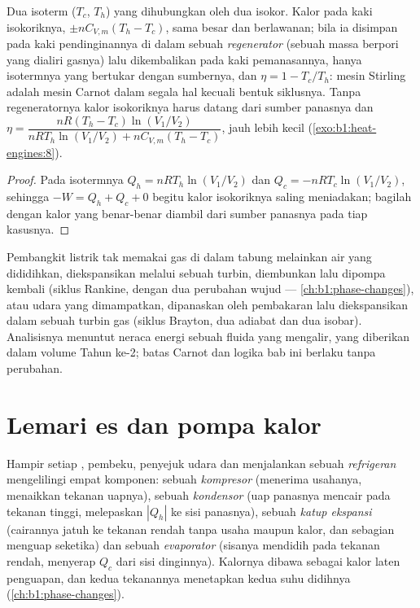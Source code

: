 \begin{proposition}\label{prop:b1:heat-engines:stirling}
Dua isoterm ($T_c$, $T_h$) yang dihubungkan oleh dua isokor. Kalor pada
kaki isokoriknya, $\pm nC_{V,m}(T_h - T_c)$, sama besar dan berlawanan; bila ia
disimpan pada kaki pendinginannya di dalam sebuah \emph{regenerator} (sebuah massa berpori yang
dialiri gasnya) lalu dikembalikan pada kaki pemanasannya, hanya isotermnya
yang bertukar dengan sumbernya, dan $\eta = 1 - T_c/T_h$: mesin Stirling
adalah mesin Carnot dalam segala hal kecuali bentuk siklusnya. Tanpa
regeneratornya kalor isokoriknya harus datang dari sumber panasnya dan
$\eta = \dfrac{nR(T_h - T_c)\ln(V_1/V_2)}{nRT_h\ln(V_1/V_2) + nC_{V,m}(T_h - T_c)}$,
jauh lebih kecil (\cref{exo:b1:heat-engines:8}).
\end{proposition}

\begin{proof}
Pada isotermnya $Q_h = nRT_h\ln(V_1/V_2)$ dan $Q_c = -nRT_c\ln(V_1/V_2)$, sehingga
$-W = Q_h + Q_c + 0$ begitu kalor isokoriknya saling meniadakan; bagilah dengan kalor
yang benar-benar diambil dari sumber panasnya pada tiap kasusnya.
\end{proof}

\begin{remark}\label{rem:b1:heat-engines:turbines}
Pembangkit listrik tak memakai gas di dalam tabung melainkan air yang dididihkan,
diekspansikan melalui sebuah turbin, diembunkan lalu dipompa kembali (siklus
Rankine, dengan dua perubahan wujud --- \cref{ch:b1:phase-changes}), atau udara
yang dimampatkan, dipanaskan oleh pembakaran lalu diekspansikan dalam sebuah turbin gas (siklus
Brayton, dua adiabat dan dua isobar). Analisisnya menuntut
neraca energi sebuah fluida yang mengalir, yang diberikan dalam volume Tahun ke-2;
batas Carnot dan logika bab ini berlaku tanpa perubahan.
\end{remark}

\section{Lemari es dan pompa kalor}

\begin{definition}\label{def:b1:heat-engines:vapourcycle}
Hampir setiap , pembeku, penyejuk udara dan  menjalankan
sebuah \emph{refrigeran} mengelilingi empat komponen: sebuah \emph{kompresor}
(menerima usahanya, menaikkan tekanan uapnya), sebuah \emph{kondensor}
(uap panasnya mencair pada tekanan tinggi, melepaskan
$|Q_h|$ ke sisi panasnya), sebuah \emph{katup ekspansi} (cairannya jatuh ke
tekanan rendah tanpa usaha maupun kalor, dan sebagian menguap seketika) dan sebuah
\emph{evaporator} (sisanya mendidih pada tekanan rendah, menyerap $Q_c$ dari
sisi dinginnya). Kalornya dibawa sebagai kalor laten penguapan, dan
kedua tekanannya menetapkan kedua suhu didihnya
(\cref{ch:b1:phase-changes}).
\end{definition}

